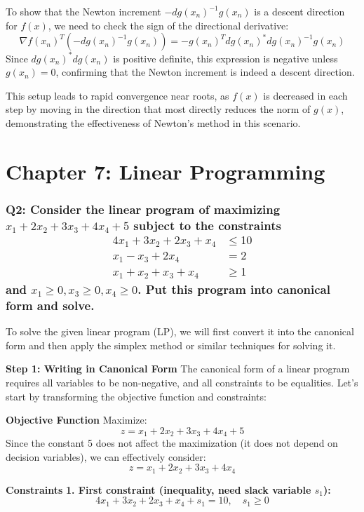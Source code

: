 \documentclass[8pt]{article}
\begin{document}
To show that the Newton increment \(- dg(x_n)^{-1} g(x_n)\) is a descent direction for \( f(x) \), we need to check the sign of the directional derivative:
\[
\nabla f(x_n)^T (- dg(x_n)^{-1} g(x_n)) = - g(x_n)^T dg(x_n)^* dg(x_n)^{-1} g(x_n)
\]
Since \( dg(x_n)^* dg(x_n) \) is positive definite, this expression is negative unless \( g(x_n) = 0 \), confirming that the Newton increment is indeed a descent direction.

This setup leads to rapid convergence near roots, as \( f(x) \) is decreased in each step by moving in the direction that most directly reduces the norm of \( g(x) \), demonstrating the effectiveness of Newton's method in this scenario.

\newpage
\section*{Chapter 7: Linear Programming}

\subsubsection*{Q2: Consider the linear program of maximizing \(x_1 + 2x_2 + 3x_3 + 4x_4 + 5\) subject to the constraints
\[
\begin{aligned}
4x_1 + 3x_2 + 2x_3 + x_4 &\leq 10 \\
x_1 - x_3 + 2x_4 &= 2 \\
x_1 + x_2 + x_3 + x_4 &\geq 1
\end{aligned}
\]
and \(x_1 \geq 0, x_3 \geq 0, x_4 \geq 0\). Put this program into canonical form and solve.}

To solve the given linear program (LP), we will first convert it into the canonical form and then apply the simplex method or similar techniques for solving it.

\textbf{Step 1: Writing in Canonical Form}
The canonical form of a linear program requires all variables to be non-negative, and all constraints to be equalities. Let's start by transforming the objective function and constraints:

\textbf{Objective Function}
Maximize:
\[
z = x_1 + 2x_2 + 3x_3 + 4x_4 + 5
\]
Since the constant 5 does not affect the maximization (it does not depend on decision variables), we can effectively consider:
\[
z = x_1 + 2x_2 + 3x_3 + 4x_4
\]

\textbf{Constraints}
\textbf{1. First constraint (inequality, need slack variable \(s_1\)):}
   \[
   4x_1 + 3x_2 + 2x_3 + x_4 + s_1 = 10, \quad s_1 \geq 0
   \]
\end{document}
